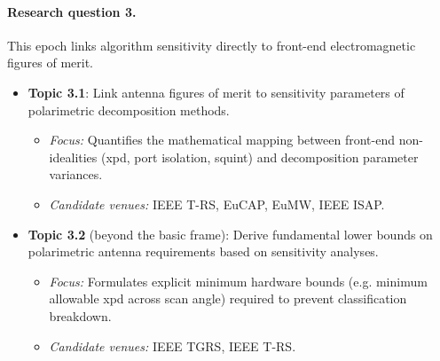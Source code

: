 \paragraph{Research question 3.}
This epoch links algorithm sensitivity directly to front-end electromagnetic figures of merit.
\begin{itemize}
    \item \textbf{Topic 3.1}: Link antenna figures of merit to sensitivity parameters of polarimetric decomposition methods.
    \begin{itemize}
        \item \textit{Focus:} Quantifies the mathematical mapping between front-end non-idealities (\gls{xpd}, port isolation, squint) and decomposition parameter variances.
        \item \textit{Candidate venues:} IEEE T-RS, EuCAP, EuMW, IEEE ISAP.
    \end{itemize}

    \item \textbf{Topic 3.2} (beyond the basic frame): Derive fundamental lower bounds on polarimetric antenna requirements based on sensitivity analyses.
    \begin{itemize}
        \item \textit{Focus:} Formulates explicit minimum hardware bounds (e.g. minimum allowable \gls{xpd} across scan angle) required to prevent classification breakdown.
        \item \textit{Candidate venues:} IEEE TGRS, IEEE T-RS.
    \end{itemize}
\end{itemize}

